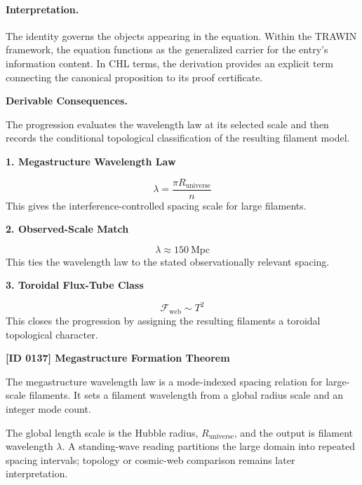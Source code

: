 \paragraph{Interpretation.}
The identity governs the objects appearing in the equation. Within the TRAWIN framework, the equation functions as the generalized carrier for the entry’s information content. In CHL terms, the derivation provides an explicit term connecting the canonical proposition to its proof certificate.

\par\vspace{0.35em}
\noindent\textbf{Derivable Consequences.}\quad
\begingroup
\footnotesize
\raggedright
The progression evaluates the wavelength law at its selected scale and then records the conditional topological classification of the resulting filament model.
\par\endgroup

\noindent\textbf{1. Megastructure Wavelength Law}\par
\[
\lambda=\frac{\pi R_{\mathrm{universe}}}{n}
\]
\noindent This gives the interference-controlled spacing scale for large filaments.\par
\noindent\textbf{2. Observed-Scale Match}\par
\[
\lambda \approx 150\ \mathrm{Mpc}
\]
\noindent This ties the wavelength law to the stated observationally relevant spacing.\par
\noindent\textbf{3. Toroidal Flux-Tube Class}\par
\[
\mathcal{F}_{\mathrm{web}}\sim T^2
\]
\noindent This closes the progression by assigning the resulting filaments a toroidal topological character.\par

\clearpage
\noindent\textbf{[ID 0137] Megastructure Formation Theorem}\par
\vspace{0.35em}
\begingroup\small


The megastructure wavelength law is a mode-indexed spacing relation for large-scale filaments. It sets a filament wavelength from a global radius scale and an integer mode count.


The global length scale is the Hubble radius, \(R_{\mathrm{universe}}\), and the output is filament wavelength \(\lambda\). A standing-wave reading partitions the large domain into repeated spacing intervals; topology or cosmic-web comparison remains later interpretation.

